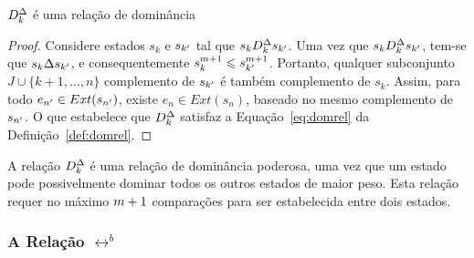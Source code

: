 \begin{myprop}
  \noindent
  $D_k^{\Delta}$ é uma relação de dominância
\end{myprop}

\begin{proof}
  \noindent
      Considere estados $s_k$ e $s_{{k'}}$ tal que $s_k D_k^{\Delta} s_{{k'}}$.
      Uma vez que $s_k D_k^{\Delta} s_{{k'}}$, tem-se que $s_k \Delta s_{{k'}}$, e consequentemente
      $s_k^{m+1} \leqslant s_{{k'}}^{m+1}$.
      Portanto, qualquer subconjunto       $J \cup \{k+1, \ldots, n\}$ complemento de $s_{{k'}}$ é também complemento de $s_k$.
      Assim, para todo $e_{{n'}} \in Ext(s_{{n'}})$, existe
      $e_{n} \in Ext(s_{n})$, baseado no mesmo complemento de $s_{{n'}}$.
      O que estabelece que $D_k^{\Delta}$ satisfaz a Equação~\ref{eq:domrel}
      da Definição~\ref{def:domrel}.
\end{proof}



A relação $D_k^{\Delta}$ é uma relação de dominância poderosa, uma vez que um estado
pode possivelmente dominar todos os outros estados de maior peso.
Esta relação requer no máximo $m+1$ comparações para ser estabelecida entre
dois estados.

\subsubsection{A Relação $\rel^b$}

